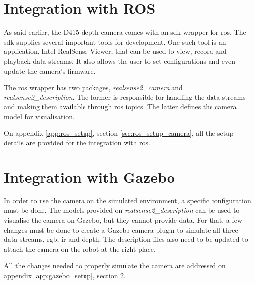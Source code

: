 


\section{Integration with ROS}
\label{sec:vision_system_integration_ros}

As said earlier, the D415 depth camera comes with an \gls{sdk} wrapper for \gls{ros}. The \gls{sdk} supplies several important tools for development. One such tool is an application, Intel\textregistered{} RealSense\texttrademark{} Viewer, that can be used to view, record and playback data streams. It also allows the user to set configurations and even update the camera's firmware.

The \gls{ros} wrapper has two packages, \textit{realsense2\_camera} and \textit{realsense2\_description}. The former is responsible for handling the data streams and making them available through \gls{ros} topics. The latter defines the camera model for visualisation.

On appendix \ref{app:ros_setup}, section \ref{sec:ros_setup_camera}, all the setup details are provided for the integration with \gls{ros}.



\section{Integration with Gazebo}
\label{sec:vision_system_integration_gazebo}

In order to use the camera on the simulated environment, a specific configuration must be done. The models provided on \textit{realsense2\_description} can be used to visualise the camera on Gazebo, but they cannot provide data. For that, a few changes must be done to create a Gazebo camera plugin to simulate all three data streams, \gls{rgb}, \gls{ir} and depth. The description files also need to be updated to attach the camera on the robot at the right place.

All the changes needed to properly simulate the camera are addressed on appendix \ref{app:gazebo_setup}, section \ref{sec:vision_system_integration_gazebo}.

